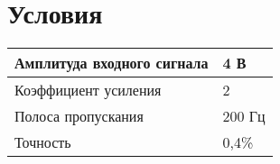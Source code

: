 \chapter{Условия}

    \begin{table}[ht]
	\begin{tabular}{|l|l|}
		\hline
Амплитуда входного сигнала & 4 В
\\ \hline
Коэффициент усиления & 2
\\ \hline
Полоса пропускания & 200 Гц
\\ \hline
Точность & 0,4\% 
\\ \hline
		
	\end{tabular}
\end{table}
